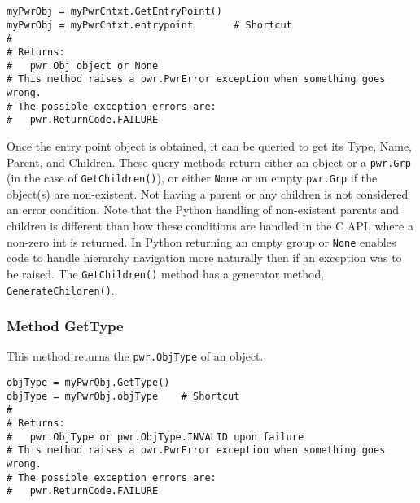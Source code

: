 \begin{center}\begin{minipage}{.95\linewidth}\begin{lstlisting}
myPwrObj = myPwrCntxt.GetEntryPoint()
myPwrObj = myPwrCntxt.entrypoint       # Shortcut
#
# Returns:
#   pwr.Obj object or None
# This method raises a pwr.PwrError exception when something goes wrong.
# The possible exception errors are:
#   pwr.ReturnCode.FAILURE
\end{lstlisting}\end{minipage}\end{center}

Once the entry point object is obtained, it can be queried to get its Type,
Name, Parent, and Children. These query methods return either an object or a
\texttt{pwr.Grp} (in the case of \texttt{GetChildren()}), or either \texttt{None}
or an empty \texttt{pwr.Grp} if the object(s) are non-existent. Not having a
parent or any children is not considered an error condition. Note that the
Python handling of non-existent parents and children is different than how
these conditions are handled in the C API, where a non-zero int is returned. In
Python returning an empty group or \texttt{None} enables code to handle
hierarchy navigation more naturally then if an exception was to be raised. The
\texttt{GetChildren()} method has a generator method, \texttt{GenerateChildren()}.

\subsubsection{Method GetType} \label{meth:GetType}

This method returns the \texttt{pwr.ObjType} of an object.

\begin{center}\begin{minipage}{.95\linewidth}\begin{lstlisting}
objType = myPwrObj.GetType()
objType = myPwrObj.objType    # Shortcut
#
# Returns:
#   pwr.ObjType or pwr.ObjType.INVALID upon failure
# This method raises a pwr.PwrError exception when something goes wrong.
# The possible exception errors are:
#   pwr.ReturnCode.FAILURE
\end{lstlisting}\end{minipage}\end{center}

